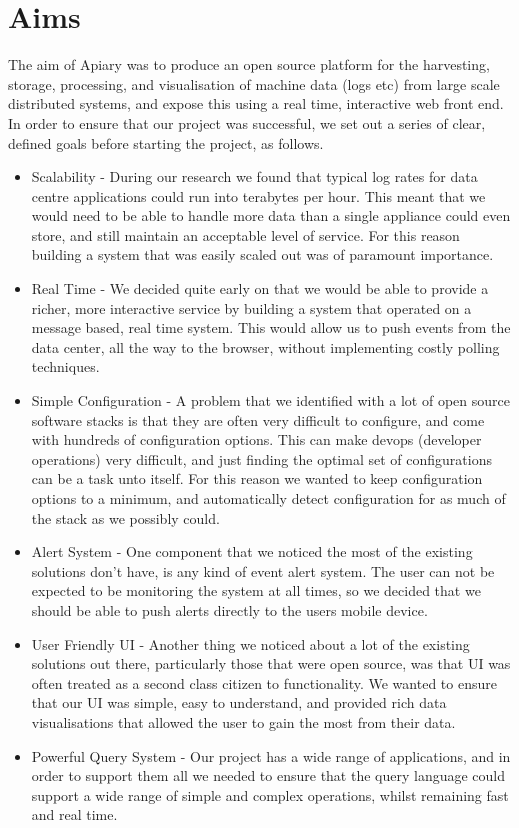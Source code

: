 \section{Aims}

The aim of Apiary was to produce an open source platform for the harvesting,
storage, processing, and visualisation of machine data (logs etc) from large
scale distributed systems, and expose this using a real time, interactive web
front end. In order to ensure that our project was successful, we set out a
series of clear, defined goals before starting the project, as follows.

\begin{itemize}

\item Scalability - During our research we found that typical log rates for
data centre applications could run into terabytes per hour. This meant that we
would need to be able to handle more data than a single appliance could even
store, and still maintain an acceptable level of service. For this reason
building a system that was easily scaled out was of paramount importance.

\item Real Time - We decided quite early on that we would be able to provide a
richer, more interactive service by building a system that operated on a
message based, real time system. This would allow us to push events from the
data center, all the way to the browser, without implementing costly polling
techniques.

\item Simple Configuration - A problem that we identified with a lot of open
source software stacks is that they are often very difficult to configure, and
come with hundreds of configuration options. This can make devops (developer
operations) very difficult, and just finding the optimal set of configurations
can be a task unto itself. For this reason we wanted to keep configuration
options to a minimum, and automatically detect configuration for as much of the
stack as we possibly could.

\item Alert System - One component that we noticed the most of the existing
solutions don't have, is any kind of event alert system. The user can not be
expected to be monitoring the system at all times, so we decided that we should
be able to push alerts directly to the users mobile device.

\item User Friendly UI - Another thing we noticed about a lot of the existing
solutions out there, particularly those that were open source, was that UI was
often treated as a second class citizen to functionality. We wanted to ensure
that our UI was simple, easy to understand, and provided rich data
visualisations that allowed the user to gain the most from their data.

\item Powerful Query System - Our project has a wide range of applications, and
in order to support them all we needed to ensure that the query language could
support a wide range of simple and complex operations, whilst remaining fast
and real time.

\end{itemize}
